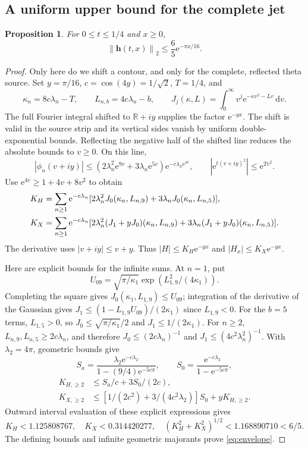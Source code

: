\documentclass[11pt]{article}
\newtheorem{proposition}[theorem]{Proposition}
\theoremstyle{remark}\newtheorem{remark}[theorem]{Remark}
\newcommand{\R}{\mathbb R}
\newcommand{\norm}[1]{\left\lVert #1\right\rVert}
\newcommand{\dd}{\,\mathrm d}
\newcommand{\jet}{\mathbf h}
\newcommand{\e}{\mathrm e}
\begin{document}
\subsection{A uniform upper bound for the complete jet}
\begin{proposition}\label{prop:envelope}
For $0\le t\le1/4$ and $x\ge0$,
\begin{equation}\label{eq:envelope}
 \norm{\jet(t,x)}_2\le\frac65\e^{-\pi x/16}.
\end{equation}
\end{proposition}
\begin{proof}
Only here do we shift a contour, and only for the complete, reflected theta source. Set $y=\pi/16$, $c=\cos(4y)=1/\sqrt2$, $T=1/4$, and
\[
 \kappa_n=8c\lambda_n-T,\qquad L_{n,b}=4c\lambda_n-b,\qquad
 J_j(\kappa,L)=\int_0^\infty v^j\e^{-\kappa v^2-Lv}\dd v.
\]
The full Fourier integral shifted to $\R+iy$ supplies the factor $\e^{-yx}$. The shift is valid in the source strip and its vertical sides vanish by uniform double-exponential bounds. Reflecting the negative half of the shifted line reduces the absolute bounds to $v\ge0$. On this line,
\[
 |\phi_n(v+iy)|\le(2\lambda_n^2\e^{9v}+3\lambda_n\e^{5v})
 \e^{-c\lambda_n\e^{4v}},\qquad
 |\e^{t(v+iy)^2}|\le\e^{Tv^2}.
\]
Use $\e^{4v}\ge1+4v+8v^2$ to obtain
\begin{align}\label{eq:KH}
 K_H&=\sum_{n\ge1}\e^{-c\lambda_n}
   [2\lambda_n^2J_0(\kappa_n,L_{n,9})+3\lambda_nJ_0(\kappa_n,L_{n,5})],\notag\\
 K_X&=\sum_{n\ge1}\e^{-c\lambda_n}
   [2\lambda_n^2(J_1+yJ_0)(\kappa_n,L_{n,9})
      +3\lambda_n(J_1+yJ_0)(\kappa_n,L_{n,5})].
\end{align}
The derivative uses $|v+iy|\le v+y$. Thus $|H|\le K_H\e^{-yx}$ and $|H_x|\le K_X\e^{-yx}$.

Here are explicit bounds for the infinite sums. At $n=1$, put
\[
 U_{09}=\sqrt{\pi/\kappa_1}\exp(L_{1,9}^2/(4\kappa_1)).
\]
Completing the square gives $J_0(\kappa_1,L_{1,9})\le U_{09}$; integration of the derivative of the Gaussian gives
$J_1\le(1-L_{1,9}U_{09})/(2\kappa_1)$ since $L_{1,9}<0$.
For the $b=5$ terms, $L_{1,5}>0$, so $J_0\le\sqrt{\pi/\kappa_1}/2$ and $J_1\le1/(2\kappa_1)$.
For $n\ge2$, $L_{n,9},L_{n,5}\ge2c\lambda_n$, and therefore $J_0\le(2c\lambda_n)^{-1}$ and $J_1\le(4c^2\lambda_n^2)^{-1}$. With $\lambda_2=4\pi$, geometric bounds give
\[
 S_a=\frac{\lambda_2\e^{-c\lambda_2}}{1-(9/4)\e^{-5c\pi}},\qquad
 S_0=\frac{\e^{-c\lambda_2}}{1-\e^{-5c\pi}},
\]
\begin{align*}
 K_{H,\ge2}&\le S_a/c+3S_0/(2c),\\
 K_{X,\ge2}&\le[1/(2c^2)+3/(4c^2\lambda_2)]S_0+yK_{H,\ge2}.
\end{align*}
Outward interval evaluation of these explicit expressions gives
\[
 K_H<1.125808767,\quad K_X<0.314420277,\quad
 (K_H^2+K_X^2)^{1/2}<1.168890710<6/5.
\]
The defining bounds and infinite geometric majorants prove \eqref{eq:envelope}.
\end{proof}
\end{document}
